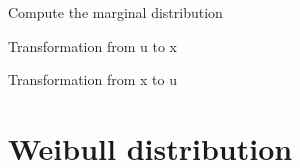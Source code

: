 \documentclass[letterpaper,10pt,english]{sphinxmanual}
\begin{document}
\begin{fulllineitems}
\begin{fulllineitems}
Compute the marginal distribution

\end{fulllineitems}



\begin{fulllineitems}
Transformation from u to x

\end{fulllineitems}



\begin{fulllineitems}
Transformation from x to u

\end{fulllineitems}


\end{fulllineitems}



\section{Weibull distribution}
\label{distributions:weibull-distribution}
\end{document}
